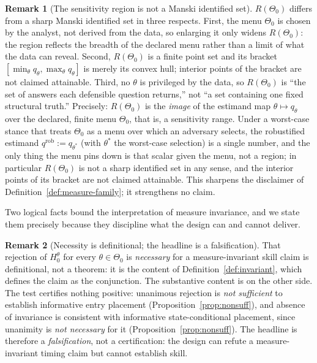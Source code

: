 \documentclass[preprint,12pt]{elsarticle}
\theoremstyle{definition}
\newtheorem{remark}{Remark}
\begin{document}
\begin{remark}[The sensitivity region is not a Manski identified set]
\label{rem:id-vs-manski}
$R(\Theta_0)$ differs from a sharp Manski identified set in three respects. First,
the menu $\Theta_0$ is chosen by the analyst, not derived from the data, so
enlarging it only widens $R(\Theta_0)$: the region reflects the breadth of the
declared menu rather than a limit of what the data can reveal. Second,
$R(\Theta_0)$ is a finite point set and its bracket
$[\min_\theta q_\theta,\max_\theta q_\theta]$ is merely its convex hull; interior
points of the bracket are not claimed attainable. Third, no $\theta$ is privileged
by the data, so $R(\Theta_0)$ is ``the set of answers each defensible question
returns,'' not ``a set containing one fixed structural truth.'' Precisely:
$R(\Theta_0)$ is the \emph{image} of the estimand map $\theta\mapsto q_\theta$ over
the declared, finite menu $\Theta_0$, that is, a sensitivity range. Under a
worst-case stance that treats $\Theta_0$ as a menu over which an adversary selects,
the robustified estimand $q^{\mathrm{rob}}:=q_{\theta^\ast}$ (with $\theta^\ast$ the
worst-case selection) is a single number, and the only thing the menu pins down is
that scalar given the menu, not a region; in particular $R(\Theta_0)$ is not a sharp
identified set in any sense, and the interior points of its bracket are not claimed
attainable. This sharpens the disclaimer of
Definition~\ref{def:measure-family}; it strengthens no claim.
\end{remark}

Two logical facts bound the interpretation of measure invariance, and we state them
precisely because they discipline what the design can and cannot deliver.

\begin{remark}[Necessity is definitional; the headline is a falsification]
\label{rem:necessity}
That rejection of $H_0^\theta$ for every $\theta\in\Theta_0$ is \emph{necessary}
for a measure-invariant skill claim is definitional, not a theorem: it is the
content of Definition~\ref{def:invariant}, which defines the claim as the
conjunction. The substantive content is on the other side. The test certifies
nothing positive: unanimous rejection is \emph{not sufficient} to establish
informative entry placement (Proposition~\ref{prop:nonsuff}), and absence of
invariance is consistent with informative state-conditional placement, since
unanimity is \emph{not necessary} for it (Proposition~\ref{prop:nonsuff}). The
headline is therefore a \emph{falsification}, not a certification: the design can
refute a measure-invariant timing claim but cannot establish skill.
\end{remark}
\end{document}
